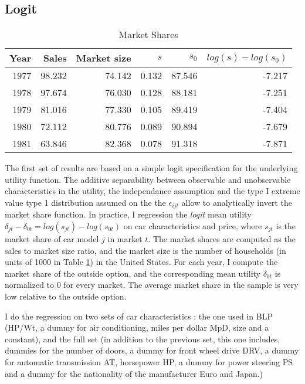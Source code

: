 \documentclass{article}\usepackage[]{graphicx}\usepackage[]{color}
\begin{document}
 \subsection{Logit}

\begin{table}[ht]
\centering
\caption{Market Shares} 
\label{tbl:market_shares}
\begingroup\footnotesize
\begin{tabular}{rrrrrr}
  \toprule 
 Year & Sales & Market size &  $s$ & $s_0$  & $log(s) - log(s_0)$ \\
 \midrule 
 1977 & 98.232 & 74.142 & 0.132 & 87.546 & -7.217 \\ 
  1978 & 97.674 & 76.030 & 0.128 & 88.181 & -7.251 \\ 
  1979 & 81.016 & 77.330 & 0.105 & 89.419 & -7.404 \\ 
  1980 & 72.112 & 80.776 & 0.089 & 90.894 & -7.679 \\ 
  1981 & 63.846 & 82.368 & 0.078 & 91.318 & -7.871 \\ 
   \bottomrule 
\end{tabular}
\endgroup
\end{table}


The first set of results are based on a simple logit specification for the underlying utility function. The additive separability between observable and unobservable characteristics in the utility, the independance assumption and the type I  extreme value type 1 distribution assumed on the the $\epsilon_{ijt}$ allow to analytically invert the market share function. In practice, I regression the \emph{logit} mean utility $\delta_{jt} - \delta_{0t} = log(s_{jt}) - log(s_{0t})$ on car characteristics and price, where $s_{jt}$ is the market share of car model $j$ in  market $t$. The market shares are computed as the sales to market size ratio, and the market size is the number of households (in units of 1000 in Table \ref{tbl:market_shares}) in the United States. For each year, I compute the market share of the outside option, and the corresponding mean utility $\delta_{0t}$ is normalized to 0 for every market. The average market share in the sample is very low relative to the outside option.

I do the regression on two sets of car characteristics : the one used in BLP (HP/Wt, a dummy for air conditioning, miles per dollar MpD, size and a constant), and the full set (in addition to the previous set, this one includes, dummies for the number of doors, a dummy for front wheel drive DRV, a dummy for automatic transmission AT, horsepower HP, a dummy for power steering PS and a dummy for the nationality of the manufacturer Euro and Japan.)
\end{document}
